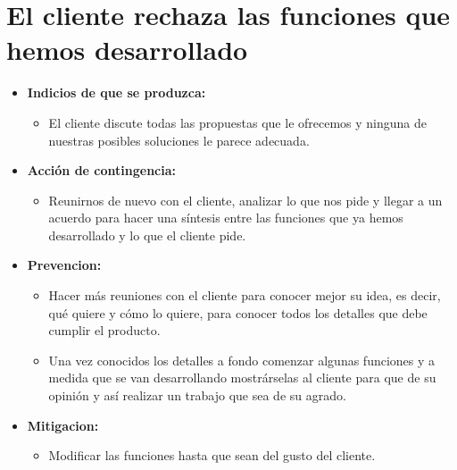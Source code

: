\documentclass[spanish,a4paper,12pt]{report}	%
\begin{document}
	\section{El cliente rechaza las funciones que hemos desarrollado}
		\begin{itemize}
			\item \textbf {Indicios de que se produzca: }
				\begin{itemize}
				  \item El cliente discute todas las
						propuestas que le ofrecemos y ninguna de nuestras posibles soluciones le parece
						adecuada.
				\end{itemize}
			\item \textbf {Acción de contingencia: }
				\begin{itemize}
				  \item Reunirnos de nuevo con el cliente,
						analizar lo que nos pide y llegar a un acuerdo para hacer una síntesis entre las
						funciones que ya hemos desarrollado y lo que el cliente pide.
				\end{itemize}
			\item \textbf {Prevencion: }
				\begin{itemize}
				  \item Hacer más reuniones con el cliente para conocer
						mejor su idea, es decir, qué quiere y cómo lo quiere, para conocer todos los
						detalles que debe cumplir el producto. 
				  \item Una vez conocidos los detalles a fondo
						comenzar algunas funciones y a medida que se van desarrollando mostrárselas al
						cliente para que de su opinión y así realizar un trabajo que sea de su agrado.
				\end{itemize}
			\item \textbf {Mitigacion: }
				\begin{itemize}
			  			\item Modificar las funciones hasta que sean del gusto del
							cliente.
				\end{itemize}
		\end{itemize}
	
\end{document}
